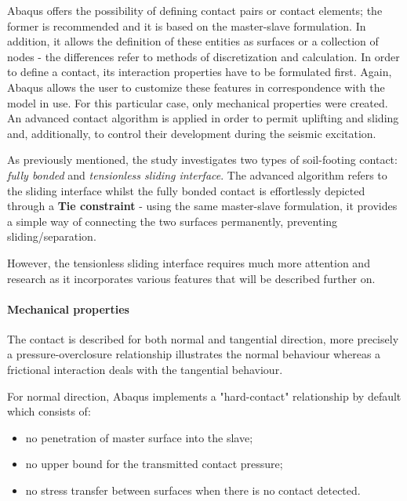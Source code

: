 Abaqus offers the possibility of defining contact pairs or contact elements; the former is recommended and it is based on the master-slave formulation. In addition, it allows the definition of these entities as surfaces or a collection of nodes - the differences refer to methods of discretization and calculation. In order to define a contact, its interaction properties have to be formulated first. Again, Abaqus allows the user to customize these features in correspondence with the model in use. For this particular case, only mechanical properties were created. An advanced contact algorithm is applied in order to permit uplifting and sliding and, additionally, to control their development during the seismic excitation. 

As previously mentioned, the study investigates two types of soil-footing contact: \textit{fully bonded} and \textit{tensionless sliding interface}. The advanced algorithm refers to the sliding interface whilst the fully bonded contact is effortlessly depicted through a \textbf{Tie constraint} - using the same master-slave formulation, it provides a simple way of connecting the two surfaces permanently, preventing sliding/separation.

However, the tensionless sliding interface requires much more attention and research as it incorporates various features that will be described further on.
 
\paragraph{Mechanical properties}   
The contact is described for both normal and tangential direction, more precisely a pressure-overclosure relationship illustrates the normal behaviour whereas a frictional interaction deals with the tangential behaviour. 

For normal direction, Abaqus implements a "hard-contact" relationship by default which consists of:
\begin{itemize}
	\item no penetration of master surface into the slave;
	\item no upper bound for the transmitted contact pressure;
	\item no stress transfer between surfaces when there is no contact detected.
\end{itemize}

